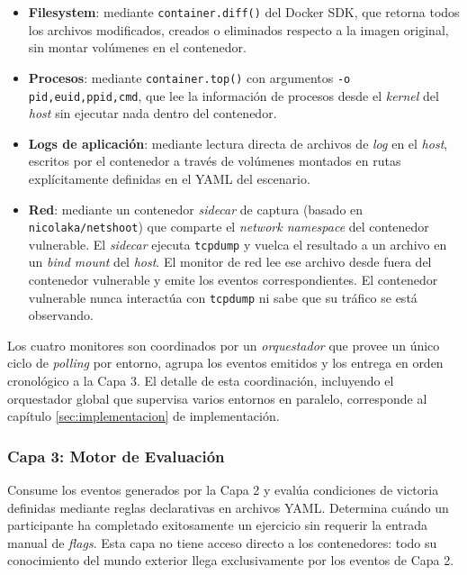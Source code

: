 \begin{itemize}
    \item \textbf{Filesystem}: mediante \texttt{container.diff()} del Docker
    SDK, que retorna todos los archivos modificados, creados o eliminados
    respecto a la imagen original, sin montar volúmenes en el contenedor.

    \item \textbf{Procesos}: mediante \texttt{container.top()} con argumentos
    \texttt{-o pid,euid,ppid,cmd}, que lee la información de procesos desde el
    \textit{kernel} del \textit{host} sin ejecutar nada dentro del contenedor.

    \item \textbf{Logs de aplicación}: mediante lectura directa de archivos de
    \textit{log} en el \textit{host}, escritos por el contenedor a través de
    volúmenes montados en rutas explícitamente definidas en el YAML del
    escenario.

    \item \textbf{Red}: mediante un contenedor \textit{sidecar} de captura
    (basado en \texttt{nicolaka/netshoot}) que comparte el \textit{network
    namespace} del contenedor vulnerable. El \textit{sidecar} ejecuta
    \texttt{tcpdump} y vuelca el resultado a un archivo en un \textit{bind
    mount} del \textit{host}. El monitor de red lee ese archivo desde fuera del
    contenedor vulnerable y emite los eventos correspondientes. El contenedor
    vulnerable nunca interactúa con \texttt{tcpdump} ni sabe que su tráfico se
    está observando.
\end{itemize}

Los cuatro monitores son coordinados por un \textit{orquestador} que provee un
único ciclo de \textit{polling} por entorno, agrupa los eventos emitidos y los
entrega en orden cronológico a la Capa 3. El detalle de esta coordinación,
incluyendo el orquestador global que supervisa varios entornos en paralelo,
corresponde al capítulo \ref{sec:implementacion} de implementación.

\subsubsection{Capa 3: Motor de Evaluación}

Consume los eventos generados por la Capa 2 y evalúa condiciones de victoria
definidas mediante reglas declarativas en archivos YAML. Determina cuándo un
participante ha completado exitosamente un ejercicio sin requerir la entrada
manual de \textit{flags}. Esta capa no tiene acceso directo a los contenedores:
todo su conocimiento del mundo exterior llega exclusivamente por los eventos de
Capa 2.


